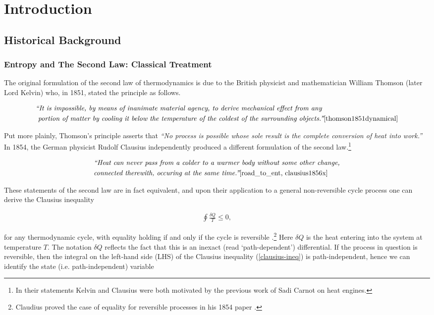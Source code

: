 \section{Introduction}\label{chapter:intro}
\subsection{Historical Background}
\subsubsection{Entropy and The Second Law: Classical Treatment}
The original formulation of the second law of thermodynamics is due to the British physicist and mathematician William Thomson (later Lord Kelvin) who, in 1851, stated the principle as follows.

\begin{align*}
  &\textit{``It is impossible, by means of inanimate material agency, to derive mechanical effect from any }\\
  &\textit{ portion of matter by cooling it below the temperature of the coldest of the surrounding objects.''}\text{\cite{thomson1851dynamical}}
\end{align*}

Put more plainly, Thomson's principle asserts that \textit{``No process is possible whose sole result is the complete conversion of heat into work.''}\cite[see \S 13.1]{blundell2008concepts} In 1854, the German physicist Rudolf Clausius independently produced a different formulation of the second law.\footnote{In their statements Kelvin and Clausius were both motivated by the previous work of Sadi Carnot on heat engines.}

\begin{align*}
  &\textit{``Heat can never pass from a colder to a warmer body without some other change,}\\
  &\textit{connected therewith, occuring at the same time.''}\text{\cite{road_to_ent, clausius1856x}}
\end{align*}

These statements of the second law are in fact equivalent, and upon their application to a general non-reversible cycle process one can derive the Clausius inequality

\begin{align}\label{clausius-ineq}
  \oint \frac{\delta Q}{T} \leq 0,
\end{align}

for any thermodynamic cycle, with equality holding if and only if the cycle is reversible \cite[see \S 13.4 \& \S 13.7]{blundell2008concepts}.\footnote{Claudius proved the case of equality for reversible processes in his 1854 paper \cite{clausius1856x}. } Here $\delta Q$ is the heat entering into the system at temperature $T$. The notation $\delta Q$ reflects the fact that this is an inexact (read `path-dependent') differential. If the process in question is reversible, then the integral on the left-hand side (LHS) of the Clausius inequality (\ref{clausius-ineq}) is path-independent, hence we can identify the state (i.e. path-independent) variable


